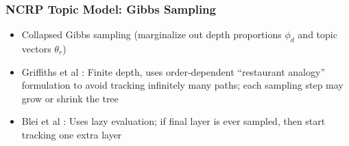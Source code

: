 \begin{frame}
\frametitle{NCRP Topic Model: Gibbs Sampling}
\begin{itemize}[<+->]
\item Collapsed Gibbs sampling (marginalize out depth proportions $\phi_d$ and topic vectors $\theta_r$)
\item Griffiths et al \cite{griffiths2004hierarchical}: Finite depth, uses order-dependent ``restaurant analogy'' formulation to avoid tracking infinitely many paths; each sampling step may grow or shrink the tree
\item Blei et al \cite{blei2010ncrp}: Uses lazy evaluation; if final layer is ever sampled, then start tracking one extra layer
\end{itemize}
\end{frame}

